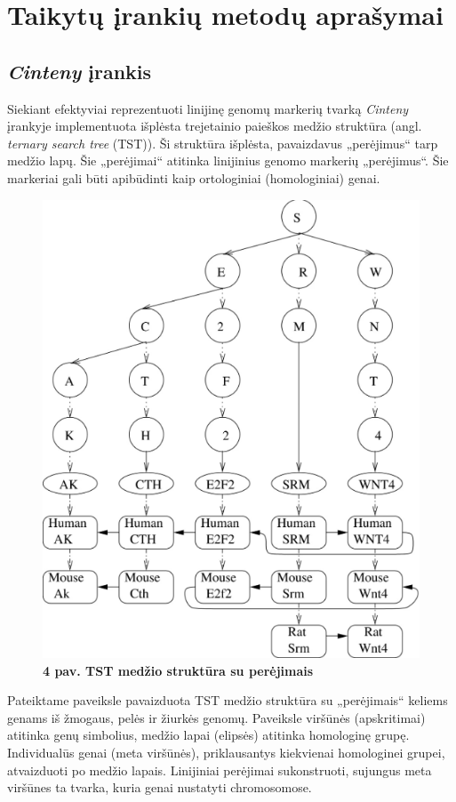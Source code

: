\documentclass[12pt]{article}
\begin{document}
\newpage


\section{Taikytų įrankių metodų aprašymai}
\subsection{\emph{Cinteny} įrankis}
Siekiant efektyviai reprezentuoti linijinę genomų markerių tvarką
\emph{Cinteny}\cite{CINTENY} įrankyje
implementuota išplėsta trejetainio paieškos medžio struktūra (angl.
\emph{ternary search tree} (TST)). Ši struktūra išplėsta, pavaizdavus 
„perėjimus“ tarp medžio lapų. Šie „perėjimai“ atitinka linijinius genomo
markerių „perėjimus“. Šie markeriai gali būti apibūdinti kaip ortologiniai
(homologiniai) genai.

\begin{figure}[htb]
    \begin{center}
        \includegraphics[width=0.4\linewidth]{../Figures/TTS_data_structure.png}
        \vspace{-0.5\baselineskip}
        \caption*{\small\textbf{4 pav. TST medžio struktūra su perėjimais}}
        \label{fig:birds}
    \end{center}
\end{figure}

Pateiktame paveiksle pavaizduota TST medžio struktūra su „perėjimais“ keliems
genams iš žmogaus, pelės ir žiurkės genomų. Paveiksle viršūnės (apskritimai)
atitinka genų simbolius, medžio lapai (elipsės) atitinka homologinę grupę.
Individualūs genai (meta viršūnės), priklausantys kiekvienai homologinei grupei,
atvaizduoti po medžio lapais. Linijiniai perėjimai sukonstruoti, sujungus meta
viršūnes ta tvarka, kuria genai nustatyti chromosomose.
\end{document}
